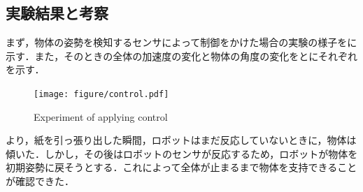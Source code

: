 \subsection{実験結果と考察}
まず，物体の姿勢を検知するセンサによって制御をかけた場合の実験の様子をに示す．また，そのときの全体の加速度の変化と物体の角度の変化をとにそれぞれを示す．
\begin{figure}[tb]
  \centering
  \texttt{[image: figure/control.pdf]}
  \caption{Experiment of applying control}
  \label{fig:control}
\end{figure}

より，紙を引っ張り出した瞬間，ロボットはまだ反応していないときに，物体は傾いた．しかし，その後はロボットのセンサが反応するため，ロボットが物体を初期姿勢に戻そうとする．これによって全体が止まるまで物体を支持できることが確認できた．

